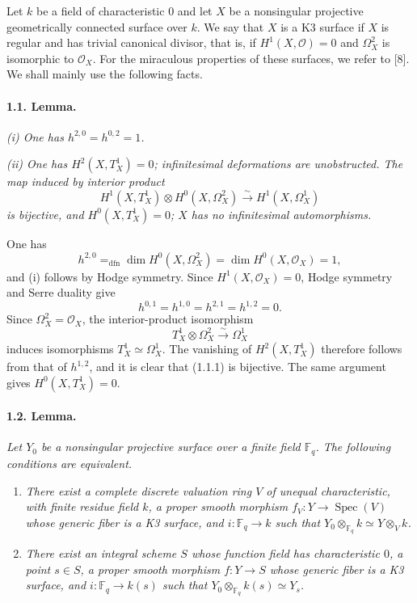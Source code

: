 \documentclass[10pt]{article}
\newcommand{\Fp}{\mathbb{F}_q}
\newcommand{\Spec}{\operatorname{Spec}}
\newcommand{\dfn}{\mathrm{dfn}}
\newcommand{\iso}{\xrightarrow{\sim}}
\begin{document}
Let $k$ be a field of characteristic $0$ and let $X$ be a nonsingular projective geometrically connected surface over $k$. We say that $X$ is a K3 surface if $X$ is regular and has trivial canonical divisor, that is, if $H^1(X,\mathcal O)=0$ and $\Omega_X^2$ is isomorphic to $\mathcal O_X$. For the miraculous properties of these surfaces, we refer to [8]. We shall mainly use the following facts.

\paragraph{1.1. Lemma.} \emph{(i) One has $h^{2,0}=h^{0,2}=1$.}

\emph{(ii) One has $H^2(X,T_X^1)=0$; infinitesimal deformations are unobstructed. The map induced by interior product
\[
\tag{1.1.1}
H^1(X,T_X^1)\otimes H^0(X,\Omega_X^2)\iso H^1(X,\Omega_X^1)
\]
is bijective, and $H^0(X,T_X^1)=0$; $X$ has no infinitesimal automorphisms.}

One has
\[
h^{2,0}=_{\dfn}\dim H^0(X,\Omega_X^2)=\dim H^0(X,\mathcal O_X)=1,
\]
and (i) follows by Hodge symmetry. Since $H^1(X,\mathcal O_X)=0$, Hodge symmetry and Serre duality give
\[
h^{0,1}=h^{1,0}=h^{2,1}=h^{1,2}=0.
\]
Since $\Omega_X^2=\mathcal O_X$, the interior-product isomorphism
\[
T_X^1\otimes \Omega_X^2\iso\Omega_X^1
\]
induces isomorphisms $T_X^1\simeq\Omega_X^1$. The vanishing of $H^2(X,T_X^1)$ therefore follows from that of $h^{1,2}$, and it is clear that (1.1.1) is bijective. The same argument gives $H^0(X,T_X^1)=0$.

\paragraph{1.2. Lemma.} \emph{Let $Y_0$ be a nonsingular projective surface over a finite field $\Fp$. The following conditions are equivalent.}
\begin{enumerate}[label=(\roman*)]
\item \emph{There exist a complete discrete valuation ring $V$ of unequal characteristic, with finite residue field $k$, a proper smooth morphism $f_V:Y\to\Spec(V)$ whose generic fiber is a K3 surface, and $i:\Fp\to k$ such that $Y_0\otimes_{\Fp}k\simeq Y\otimes_Vk$.}
\item \emph{There exist an integral scheme $S$ whose function field has characteristic $0$, a point $s\in S$, a proper smooth morphism $f:Y\to S$ whose generic fiber is a K3 surface, and $i:\Fp\to k(s)$ such that $Y_0\otimes_{\Fp}k(s)\simeq Y_s$.}
\end{enumerate}
\end{document}
